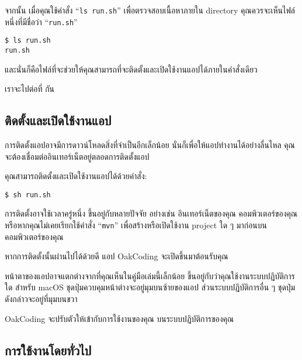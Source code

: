 จากนั้น เมื่อคุณใช้คำสั่ง ``\texttt{ls run.sh}'' เพื่อตรวจสอบเนื้อหาภายใน directory คุณควรจะเห็นไฟล์หนึ่งที่มีชื่อว่า ``\texttt{run.sh}''

\begin{lstlisting}[numbers=none]
$ ls run.sh
run.sh
\end{lstlisting}

และนั่นก็คือไฟล์ที่จะช่วยให้คุณสามารถที่จะติดตั้งและเปิดใช้งานแอปได้ภายในคำสั่งเดียว

เราจะไปต่อที่  กัน

\clearpage

\subsection{ติดตั้งและเปิดใช้งานแอป}\label{subsec:launch-app}

\rule{0em}{1ex}

การติดตั้งแอปอาจมีการดาวน์โหลดสิ่งที่จำเป็นอีกเล็กน้อย
นั่นก็เพื่อให้แอปทำงานได้อย่างลื่นไหล
คุณจะต้องเชื่อมต่ออินเทอร์เน็ตอยู่ตลอดการติดตั้งแอป

คุณสามารถติดตั้งและเปิดใช้งานแอปได้ด้วยคำสั่ง:

\begin{lstlisting}[numbers=none]
$ sh run.sh
\end{lstlisting}

การติดตั้งอาจใช้เวลาครู่หนึ่ง ขึ้นอยู่กับหลายปัจจัย อย่างเช่น อินเทอร์เน็ตของคุณ
คอมพิวเตอร์ของคุณ หรือหากคุณไม่เคยเรียกใช้คำสั่ง ``\texttt{mvn}'' เพื่อสร้างหรือเปิดใช้งาน
project ใด ๆ มาก่อนบนคอมพิวเตอร์ของคุณ

หากการติดตั้งนั้นผ่านไปได้ด้วยดี แอป OakCoding จะเปิดขึ้นมาต้อนรับคุณ


หน้าตาของแอปอาจแตกต่างจากที่คุณเห็นในคู่มือเล่มนี้เล็กน้อย
ขึ้นอยู่กับว่าคุณใช้งานระบบปฏิบัติการใด สำหรับ macOS ชุดปุ่มควบคุมหน้าต่างจะอยู่มุมบนซ้ายของแอป
ส่วนระบบปฏิบัติการอื่น ๆ ชุดปุ่มดังกล่าวจะอยู่ที่มุมบนขวา

OakCoding จะปรับตัวให้เข้ากับการใช้งานของคุณ บนระบบปฏิบัติการของคุณ

\clearpage

\subsection{การใช้งานโดยทั่วไป}\label{subsec:general-usage}


